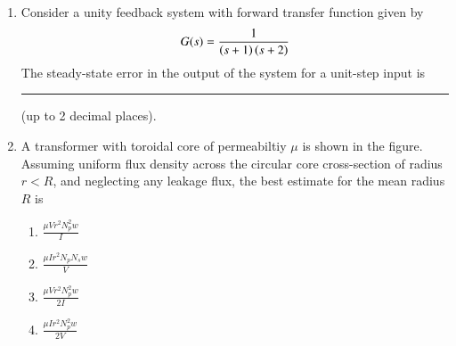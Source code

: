\documentclass[journal,12pt,onecolumn]{IEEEtran}
\theoremstyle{remark}
\begin{document}
\begin{enumerate}
\item Consider a unity feedback system with forward transfer function given by 
\[
G(s)=\frac{1}{\left(s+1\right)\left(s+2\right)}
\]
The steady-state error in the output of the system for a unit-step input is \rule{2cm}{0.4pt} (up to 2 decimal places).

\item A transformer with toroidal core of permeabiltiy $\mu$ is shown in the figure. Assuming uniform flux density across the circular core cross-section of radius $r<R$, and neglecting any leakage flux, the best estimate for the mean radius $R$ is


\begin{enumerate}
\item $\frac{\mu Vr^2N_p^2w}{I}$
\item $\frac{\mu Ir^2N_pN_sw}{V}$
\item $\frac{\mu Vr^2N_p^2w}{2I}$
\item $\frac{\mu Ir^2N_p^2w}{2V}$
\end{enumerate}
\end{enumerate}
\end{document}
